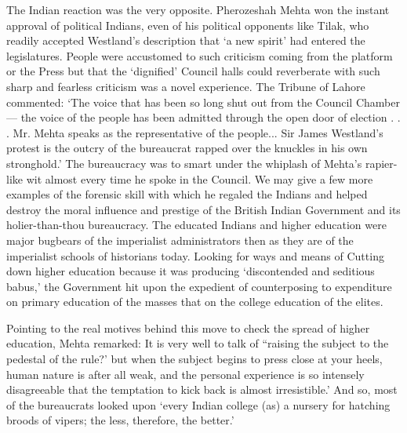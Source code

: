 The Indian reaction was the very opposite. Pherozeshah Mehta won the instant approval of political Indians, even of his political opponents like Tilak, who readily accepted Westland’s description that ‘a new spirit’ had entered the legislatures. People were accustomed to such criticism coming from the platform or the Press but that the ‘dignified’ Council halls could reverberate with such sharp and fearless criticism was a novel experience. The Tribune of Lahore commented: ‘The voice that has been so long shut out from the Council Chamber — the voice of the people has been admitted through the open door of election . . . Mr. Mehta speaks as the representative of the people... Sir James Westland’s protest is the outcry of the bureaucrat rapped over the knuckles in his own stronghold.’ The bureaucracy was to smart under the whiplash of Mehta’s rapier- like wit almost every time he spoke in the Council. We may give a few more examples of the forensic skill with which he regaled the Indians and helped destroy the moral influence and prestige of the British Indian Government and its holier-than-thou bureaucracy. The educated Indians and higher education were major bugbears of the imperialist administrators then as they are of the imperialist schools of historians today. Looking for ways and means of Cutting down higher education because it was producing ‘discontended and seditious babus,’ the Government hit upon the expedient of counterposing to expenditure on primary education of the masses that on the college education of the elites.

Pointing to the real motives behind this move to check the spread of higher education, Mehta remarked: It is very well to talk of “raising the subject to the pedestal of the rule?’ but when the subject begins to press close at your heels, human nature is after all weak, and the personal experience is so intensely disagreeable that the temptation to kick back is almost irresistible.’ And so, most of the bureaucrats looked upon ‘every Indian college (as) a nursery for hatching broods of vipers; the less, therefore, the better.’

